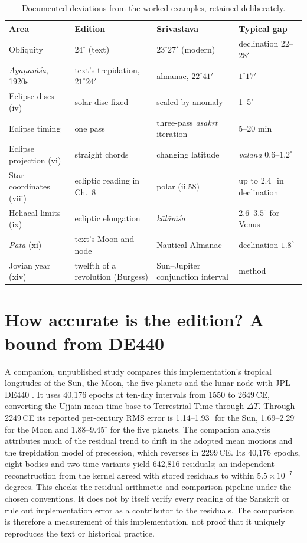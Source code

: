 \documentclass[11pt,a4paper]{article}
\begin{document}
\begin{table}[ht]
\centering
\caption{Documented deviations from the worked examples, retained deliberately.}
\label{tab:deviations}
\small
\begin{tabularx}{\textwidth}{@{}l L L l@{}}
\toprule
Area & Edition & Srivastava & Typical gap \\
\midrule
Obliquity & $24^\circ$ (text) & $23^\circ27'$ (modern) & declination 22--28$'$ \\
\textit{Aya\d{n}\=a\.m\'sa}, 1920s & text's trepidation, $21^\circ24'$ & almanac, $22^\circ41'$ & $1^\circ17'$ \\
Eclipse discs (iv) & solar disc fixed & scaled by anomaly & 1--5$'$ \\
Eclipse timing & one pass & three-pass \textit{asakrt} iteration & 5--20 min \\
Eclipse projection (vi) & straight chords & changing latitude & \textit{valana} 0.6--$1.2^\circ$ \\
Star coordinates (viii) & ecliptic reading in Ch.~8 & polar (ii.58) & up to $2.4^\circ$ in declination \\
Heliacal limits (ix) & ecliptic elongation & \textit{k\=al\=a\.m\'sa} & 2.6--$3.5^\circ$ for Venus \\
\textit{P\=ata} (xi) & text's Moon and node & Nautical Almanac & declination $1.8^\circ$ \\
Jovian year (xiv) & twelfth of a revolution (Burgess) & Sun--Jupiter conjunction interval & method \\
\bottomrule
\end{tabularx}
\end{table}

\section{How accurate is the edition? A bound from DE440}
\label{sec:de440}

A companion, unpublished study \citep{nigam2026de440} compares this implementation's tropical longitudes of the Sun, the Moon, the five planets and the lunar node with JPL DE440 \citep{park2021}. It uses 40,176 epochs at ten-day intervals from 1550 to 2649\,CE, converting the Ujjain-mean-time base to Terrestrial Time through $\Delta T$. Through 2249\,CE its reported per-century RMS error is 1.14--1.93$^\circ$ for the Sun, 1.69--2.29$^\circ$ for the Moon and 1.88--9.45$^\circ$ for the five planets. The companion analysis attributes much of the residual trend to drift in the adopted mean motions and the trepidation model of precession, which reverses in 2299\,CE. Its 40,176 epochs, eight bodies and two time variants yield 642,816 residuals; an independent reconstruction from the kernel agreed with stored residuals to within $5.5\times10^{-7}$ degrees. This checks the residual arithmetic and comparison pipeline under the chosen conventions. It does not by itself verify every reading of the Sanskrit or rule out implementation error as a contributor to the residuals. The comparison is therefore a measurement of this implementation, not proof that it uniquely reproduces the text or historical practice.
\end{document}

